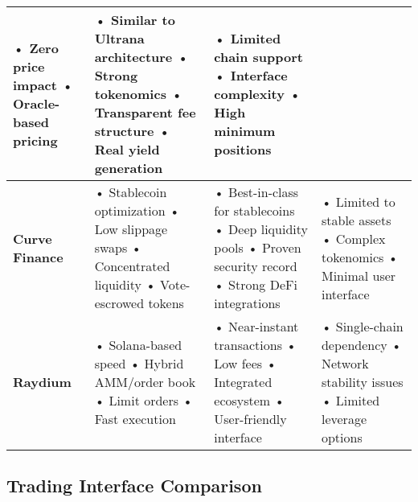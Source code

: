 \documentclass{article}
\begin{document}
\begin{longtable}{|p{}|p{}|p{}|p{}|}
• Zero price impact \newline
• Oracle-based pricing &
• Similar to Ultrana architecture \newline
• Strong tokenomics \newline
• Transparent fee structure \newline
• Real yield generation &
• Limited chain support \newline
• Interface complexity \newline
• High minimum positions \\
\hline
\textbf{Curve Finance} & 
• Stablecoin optimization \newline
• Low slippage swaps \newline
• Concentrated liquidity \newline
• Vote-escrowed tokens &
• Best-in-class for stablecoins \newline
• Deep liquidity pools \newline
• Proven security record \newline
• Strong DeFi integrations &
• Limited to stable assets \newline
• Complex tokenomics \newline
• Minimal user interface \\
\hline
\textbf{Raydium} & 
• Solana-based speed \newline
• Hybrid AMM/order book \newline
• Limit orders \newline
• Fast execution &
• Near-instant transactions \newline
• Low fees \newline
• Integrated ecosystem \newline
• User-friendly interface &
• Single-chain dependency \newline
• Network stability issues \newline
• Limited leverage options \\
\hline
\end{longtable}

\subsection{Trading Interface Comparison}
\end{document}
